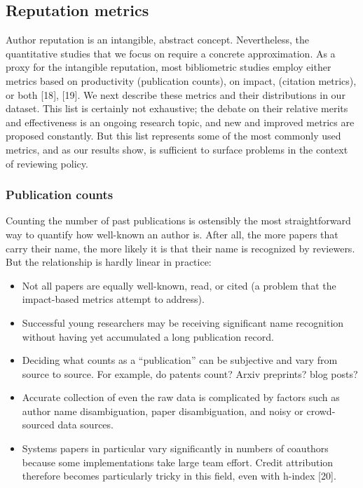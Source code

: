 \documentclass[12pt]{article}
\providecommand{\tightlist}{%
  \setlength{\itemsep}{0pt}\setlength{\parskip}{0pt}}
\begin{document}
\hypertarget{subsec:metrics}{%
\subsection{Reputation metrics}\label{subsec:metrics}}

Author reputation is an intangible, abstract concept. Nevertheless, the quantitative studies that we focus on require a concrete approximation. As a proxy for the intangible reputation, most bibliometric studies employ either metrics based on productivity (publication counts), on impact, (citation metrics), or both {[}18{]}, {[}19{]}. We next describe these metrics and their distributions in our dataset. This list is certainly not exhaustive; the debate on their relative merits and effectiveness is an ongoing research topic, and new and improved metrics are proposed constantly. But this list represents some of the most commonly used metrics, and as our results show, is sufficient to surface problems in the context of reviewing policy.

\hypertarget{publication-counts}{%
\subsubsection{Publication counts}\label{publication-counts}}

Counting the number of past publications is ostensibly the most straightforward way to quantify how well-known an author is. After all, the more papers that carry their name, the more likely it is that their name is recognized by reviewers. But the relationship is hardly linear in practice:

\begin{itemize}
\tightlist
\item
  Not all papers are equally well-known, read, or cited (a problem that the impact-based metrics attempt to address).
\item
  Successful young researchers may be receiving significant name recognition without having yet accumulated a long publication record.
\item
  Deciding what counts as a ``publication'' can be subjective and vary from source to source. For example, do patents count? Arxiv preprints? blog posts?
\item
  Accurate collection of even the raw data is complicated by factors such as author name disambiguation, paper disambiguation, and noisy or crowd-sourced data sources.
\item
  Systems papers in particular vary significantly in numbers of coauthors because some implementations take large team effort. Credit attribution therefore becomes particularly tricky in this field, even with h-index {[}20{]}.
\end{itemize}
\end{document}
